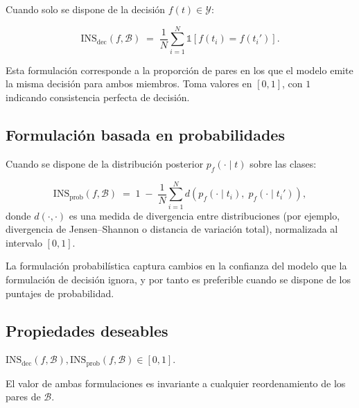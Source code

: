 Cuando solo se dispone de la decisión $f(t) \in \mathcal{Y}$:

\begin{definicion}
\label{def:ins-decision}
\[
  \mathrm{INS}_{\mathrm{dec}}(f, \mathcal{B}) \;=\;
  \frac{1}{N} \sum_{i=1}^{N} \mathbb{1}\!\left[ f(t_i) = f(t_i') \right].
\]
\end{definicion}

\noindent
Esta formulación corresponde a la proporción de pares en los que el modelo
emite la misma decisión para ambos miembros. Toma valores en $[0,1]$, con $1$
indicando consistencia perfecta de decisión.

\subsection{Formulación basada en probabilidades}

Cuando se dispone de la distribución posterior $p_f(\cdot \mid t)$ sobre las
clases:

\begin{definicion}
\label{def:ins-prob}
\[
  \mathrm{INS}_{\mathrm{prob}}(f, \mathcal{B}) \;=\;
  1 \;-\; \frac{1}{N} \sum_{i=1}^{N}
  d\!\left( p_f(\cdot \mid t_i),\; p_f(\cdot \mid t_i') \right),
\]
\noindent donde $d(\cdot,\cdot)$ es una medida de divergencia entre
distribuciones (por ejemplo, divergencia de Jensen--Shannon o distancia de
variación total), normalizada al intervalo $[0,1]$.
\end{definicion}

\noindent
La formulación probabilística captura cambios en la confianza del modelo que
la formulación de decisión ignora, y por tanto es preferible cuando se dispone
de los puntajes de probabilidad.

\subsection{Propiedades deseables}

\begin{proposicion}[Acotación]
$\mathrm{INS}_{\mathrm{dec}}(f, \mathcal{B}), \mathrm{INS}_{\mathrm{prob}}(f, \mathcal{B}) \in [0,1]$.
\end{proposicion}

\begin{proposicion}
El valor de ambas formulaciones es invariante a cualquier reordenamiento de
los pares de $\mathcal{B}$.
\end{proposicion}

